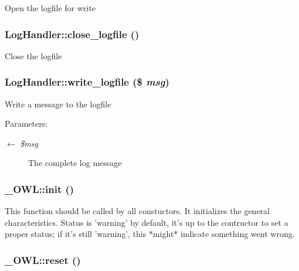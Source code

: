 Open the logfile for write \hypertarget{classLogHandler_1a3b03d9bb97404a4f746bd2aacc5a8c}{
\subsubsection{\setlength{\rightskip}{0pt plus 5cm}LogHandler::close\_\-logfile ()}}
\label{classLogHandler_1a3b03d9bb97404a4f746bd2aacc5a8c}


Close the logfile \hypertarget{classLogHandler_e0cd68fb6f068e47f899a1e4c7f29ba9}{
\subsubsection{\setlength{\rightskip}{0pt plus 5cm}LogHandler::write\_\-logfile (\$ {\em msg})}}
\label{classLogHandler_e0cd68fb6f068e47f899a1e4c7f29ba9}


Write a message to the logfile

\begin{Desc}
\item[Parameters:]
\begin{description}
\item[\mbox{$\leftarrow$} {\em \$msg}]The complete log message \end{description}
\end{Desc}
\hypertarget{class__OWL_e0ef3ded56e8a6b34b6461e5a721cd3e}{
\subsubsection{\setlength{\rightskip}{0pt plus 5cm}\_\-OWL::init ()}}
\label{class__OWL_e0ef3ded56e8a6b34b6461e5a721cd3e}


This function should be called by all constuctors. It initializes the general characteristics. Status is 'warning' by default, it's up to the contructor to set a proper status; if it's still 'warning', this $\ast$might$\ast$ indicate something went wrong. \hypertarget{class__OWL_2f2a042bcf31965194c03033df0edc9b}{
\subsubsection{\setlength{\rightskip}{0pt plus 5cm}\_\-OWL::reset ()}}
\label{class__OWL_2f2a042bcf31965194c03033df0edc9b}



